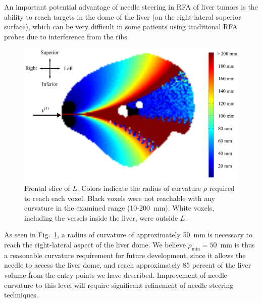 An important potential advantage of needle steering in RFA of liver tumors is the ability to reach targets in the dome of the liver (on the right-lateral superior surface), which can be very difficult in some patients using traditional RFA probes due to interference from the ribs.
  
\begin{figure}[!t]
\centering
\includegraphics[width = \textwidth]{Images/Chapter3/FrontalSlice/FrontalSlice}%
\caption[Reachable set size as a function of $\rho_{\text{min}}$]{Frontal slice of $L$. Colors indicate the radius of curvature $\rho$ required to reach each voxel. Black voxels were not reachable with any curvature in the examined range (10-200~mm). White voxels, including the vessels inside the liver, were outside $L$.}
\label{fig:FrontalSlice}
\end{figure}  

As seen in Fig.~\ref{fig:FrontalSlice}, a radius of curvature of approximately 50~mm is necessary to reach the right-lateral aspect of the liver dome. We believe $\rho_{\text{min}} = 50$~mm is thus a reasonable curvature requirement for future development, since it allows the needle to access the liver dome, and reach approximately 85 percent of the liver volume from the entry points we have described. Improvement of needle curvature to this level will require significant refinement of needle steering techniques.  

